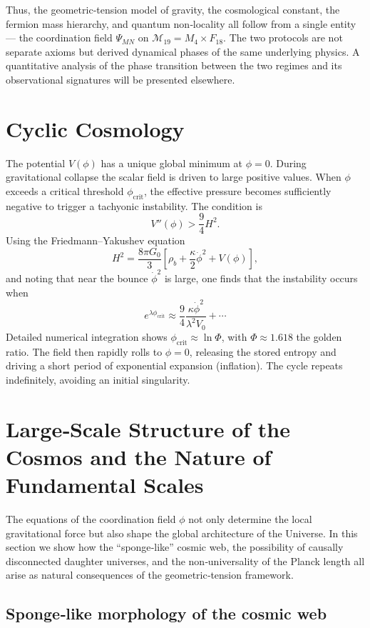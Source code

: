 \documentclass[12pt,a4paper]{article}
\begin{document}
	Thus, the geometric‑tension model of gravity, the cosmological constant,
	the fermion mass hierarchy, and quantum non‑locality all follow from a
	single entity — the coordination field $\Psi_{MN}$ on
	$\mathcal{M}_{19}=M_4\times F_{18}$. The two protocols are not separate
	axioms but derived dynamical phases of the same underlying physics.
	A quantitative analysis of the phase transition between the two regimes
	and its observational signatures will be presented elsewhere.
	
	\section{Cyclic Cosmology}
	
	The potential \(V(\phi)\) has a unique global minimum at \(\phi=0\). During gravitational collapse the scalar field is driven to large positive values. When \(\phi\) exceeds a critical threshold \(\phi_{\mathrm{crit}}\), the effective pressure becomes sufficiently negative to trigger a tachyonic instability. The condition is
	\[
	V''(\phi) > \frac{9}{4} H^2.
	\]
	Using the Friedmann--Yakushev equation
	\[
	H^2 = \frac{8\pi G_0}{3} \left[ \rho_b + \frac{\kappa}{2}\dot\phi^2 + V(\phi) \right],
	\]
	and noting that near the bounce \(\dot\phi^2\) is large, one finds that the instability occurs when
	\[
	e^{\lambda\phi_{\mathrm{crit}}} \approx \frac{9}{4} \frac{\kappa\dot\phi^2}{\lambda^2 V_0} + \cdots
	\]
	Detailed numerical integration shows \(\phi_{\mathrm{crit}} \approx \ln\Phi\), with \(\Phi \approx 1.618\) the golden ratio. The field then rapidly rolls to \(\phi=0\), releasing the stored entropy and driving a short period of exponential expansion (inflation). The cycle repeats indefinitely, avoiding an initial singularity.
	
	\section{Large‑Scale Structure of the Cosmos and the Nature of Fundamental Scales}
	\label{sec:sponge}
	
	The equations of the coordination field $\phi$ not only determine the local gravitational force but also shape
	the global architecture of the Universe. In this section we show how the ``sponge‑like'' cosmic web,
	the possibility of causally disconnected daughter universes, and the non‑universality of the Planck length
	all arise as natural consequences of the geometric‑tension framework.
	
	\subsection{Sponge‑like morphology of the cosmic web}
	
\end{document}
